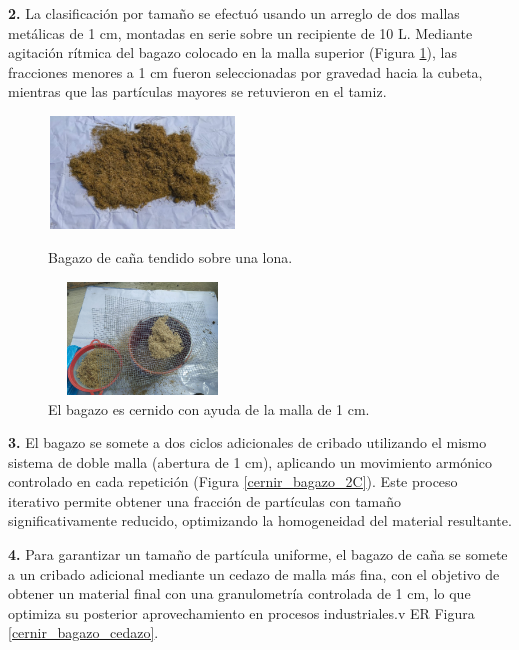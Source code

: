 \documentclass[12pt]{article}
\begin{document}
			
			\textbf{2.}	La clasificación por tamaño se efectuó usando un arreglo de dos mallas metálicas de 1 cm, montadas en serie sobre un recipiente de 10 L. Mediante agitación rítmica del bagazo colocado en la malla superior (Figura \ref{cernir_bagazo_B}), las fracciones menores a 1 cm fueron seleccionadas por gravedad hacia la cubeta, mientras que las partículas mayores se retuvieron en el tamiz.
		
			
				\begin{figure}[H]
				\centering
				\begin{minipage}{0.46\textwidth}
					\centering
					\includegraphics[width=5cm, height=3cm]{imagenes/secado de bagazo} %
					\caption{Bagazo de caña tendido sobre una lona.}
					\label{secado1}
				\end{minipage}
				\hfill
				\begin{minipage}{0.48\textwidth}
					\centering
					\includegraphics[width=5cm, height=3cm]{imagenes/cernir_bagazo_1} %
					\caption{El bagazo es cernido con ayuda de la malla de 1 cm.}
					\label{cernir_bagazo_B}
				\end{minipage}
			\end{figure}
			
			
			
			
			
			\textbf{3.}	El bagazo se somete a dos ciclos adicionales de cribado utilizando el mismo sistema de doble malla (abertura de 1 cm), aplicando un movimiento armónico controlado en cada repetición (Figura \ref{cernir_bagazo_2C}). Este proceso iterativo permite obtener una fracción de partículas con tamaño significativamente reducido, optimizando la homogeneidad del material resultante.
			
			
			\textbf{4.} Para garantizar un tamaño de partícula uniforme, el bagazo de caña se somete a un cribado adicional mediante un cedazo de malla más fina, con el objetivo de obtener un material final con una granulometría controlada de 1 cm, lo que optimiza su posterior aprovechamiento en procesos industriales.v	ER Figura \ref{cernir_bagazo_cedazo}.
		
\end{document}

